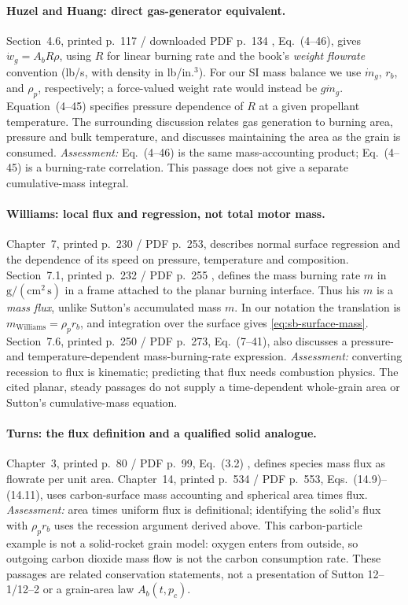 \paragraph{Huzel and Huang: direct gas-generator equivalent.}
Section~4.6, printed p.~117 / downloaded PDF p.~134
\cite{huzelhuang}, Eq.~(4--46), gives
$\dot w_g=A_bR\rho$, using $R$ for linear burning rate and the book's
\emph{weight flowrate} convention (lb/s, with density in lb/in.$^3$).
For our SI mass balance we use $\dot m_g$, $r_b$, and
$\rho_p$, respectively; a force-valued weight rate would instead be
$g\dot m_g$. Equation~(4--45) specifies pressure dependence
of $R$ at a given propellant temperature. The surrounding discussion
relates gas generation to burning area, pressure and bulk temperature,
and discusses maintaining the area as the grain is consumed.
\emph{Assessment:} Eq.~(4--46) is the same mass-accounting product;
Eq.~(4--45) is a burning-rate correlation. This passage does not give
a separate cumulative-mass integral.

\paragraph{Williams: local flux and regression, not total motor mass.}
Chapter~7, printed p.~230 / PDF p.~253, describes normal surface
regression and the dependence of its speed on pressure, temperature and
composition. Section~7.1, printed p.~232 / PDF p.~255 \cite{williams},
defines the mass burning rate $m$ in $\mathrm{g}/(\mathrm{cm}^2\,\mathrm s)$
in a frame attached to the planar burning interface. Thus his $m$ is a
\emph{mass flux}, unlike Sutton's accumulated mass $m$. In our notation
the translation is $m_{\mathrm{Williams}}=\rho_p r_b$, and integration over
the surface gives \eqref{eq:sb-surface-mass}. Section~7.6,
printed p.~250 / PDF p.~273, Eq.~(7--41), also discusses a
pressure- and temperature-dependent mass-burning-rate expression.
\emph{Assessment:} converting recession to flux is kinematic;
predicting that flux needs combustion physics. The cited planar,
steady passages do not supply a time-dependent whole-grain area or
Sutton's cumulative-mass equation.

\paragraph{Turns: the flux definition and a qualified solid analogue.}
Chapter~3, printed p.~80 / PDF p.~99, Eq.~(3.2) \cite{turns},
defines species mass flux as flowrate per unit area.
Chapter~14, printed p.~534 / PDF p.~553, Eqs.~(14.9)--(14.11),
uses carbon-surface mass accounting and spherical area times flux.
\emph{Assessment:} area times uniform flux is definitional; identifying
the solid's flux with $\rho_p r_b$ uses the recession argument derived
above. This carbon-particle example is not a solid-rocket grain model:
oxygen enters from outside, so outgoing carbon dioxide mass flow is
not the carbon consumption rate. These passages are related
conservation statements, not a presentation of Sutton 12--1/12--2 or
a grain-area law $A_b(t,p_c)$.



